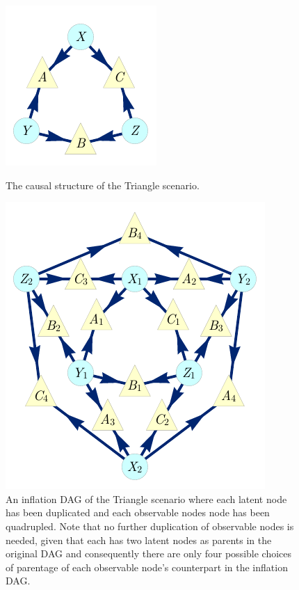 \begin{figure}[h]
\centering
\begin{minipage}[b]{0.23\linewidth}
\centering
\includegraphics[scale=1]{TriDagRaw.pdf}
\caption{The causal structure of the Triangle scenario.}\label{fig:TriMainDAG}
\end{minipage}
\hfill
\begin{minipage}[t]{0.38\linewidth}
\centering
\includegraphics[scale=1]{TriDagFull222.pdf}
\caption{An inflation DAG of the Triangle scenario where each latent node has been duplicated and each observable nodes node has been quadrupled.  Note that no further duplication of observable nodes is needed, given that each has two latent nodes as parents in the original DAG and consequently there are only four possible choices of parentage of each observable node's counterpart in the inflation DAG. }\label{fig:TriFullDouble}
\end{minipage}
\hfill
\begin{minipage}[b]{0.35\linewidth}

\end{minipage}
\end{figure}

